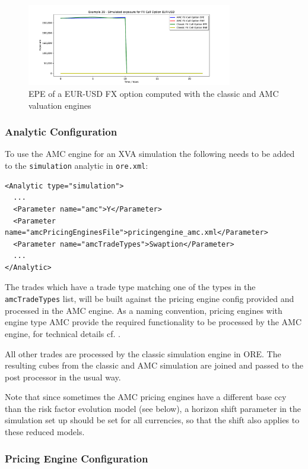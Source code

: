 \begin{figure}
  \includegraphics[width=0.8\textwidth]{examples/mpl_amc_fxoption.pdf}
  \caption{EPE of a EUR-USD FX option computed with the classic and AMC valuation engines}
  \label{epe_fxoption}
\end{figure}

\subsubsection*{Analytic Configuration}
\label{sec:amc_applicationconfig}

To use the AMC engine for an XVA simulation the following needs to be added to the {\tt simulation} analytic
in {\tt ore.xml}:

\begin{verbatim}
<Analytic type="simulation">
  ...
  <Parameter name="amc">Y</Parameter>
  <Parameter name="amcPricingEnginesFile">pricingengine_amc.xml</Parameter>
  <Parameter name="amcTradeTypes">Swaption</Parameter>
  ...
</Analytic>
\end{verbatim}

The trades which have a trade type matching one of the types in the \verb+amcTradeTypes+ list, will be built against the
pricing engine config provided and processed in the AMC engine. As a naming convention, pricing engines with engine type
AMC provide the required functionality to be processed by the AMC engine, for technical details cf. \cite{methods}.

All other trades are processed by the classic simulation engine in ORE. The resulting cubes from the classic and AMC
simulation are joined and passed to the post processor in the usual way.

Note that since sometimes the AMC pricing engines have a different base ccy than the risk factor evolution model (see
below), a horizon shift parameter in the simulation set up should be set for all currencies, so that the shift also
applies to these reduced models.

\subsubsection*{Pricing Engine Configuration}
\label{sec:amc_pricingengineconfig}

